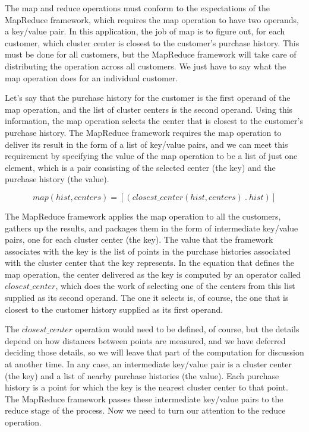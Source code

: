 The map and reduce operations must conform to the expectations of the MapReduce framework, which requires the map operation to have two operands,
a key/value pair.  In this application, the job of map is
to figure out, for each customer, which cluster center is closest to the customer's
purchase history. This must be done for all customers, but the MapReduce
framework will take care of distributing the operation across all customers.
We just have to say what the map operation does for an individual customer.

Let's say that the purchase history for the customer is the first operand
of the map operation, and the list of cluster centers is the second operand.
Using this information, the map operation selects the center that is closest
to the customer's purchase history. The MapReduce framework requires the map
operation to deliver its result in the form of a list of key/value pairs,
and we can meet this requirement by specifying the value of the map operation
to be a list of just one element, which is a pair consisting of
the selected center (the key) and the purchase history (the value).

\begin{displaymath}
map(hist, centers) = [ ( closest\_center(hist, centers) ~.~ hist ) ]
\end{displaymath}


The MapReduce framework applies the map operation to all the customers,
gathers up the results, and packages them in the form of
intermediate key/value pairs, one for each cluster center (the key).
The value that the framework associates with the key is the list of
points in the purchase histories associated with the cluster center that
the key represents. 
In the equation that defines the map operation,
the center delivered as the key is computed by an operator
called $closest\_center$, which does the work of selecting one
of the centers from this list supplied as its second operand.
The one it selects is, of course, the one that is closest to
the customer history supplied as its first operand.

The $closest\_center$ operation would need to be defined,
of course, but the details depend on how distances between
points are measured, and we have deferred deciding those 
details, so we will leave that part of the computation
for discussion at another time.
In any case, an intermediate key/value pair is a cluster center
(the key) and a list of nearby purchase histories
(the value). Each purchase history is a point for which the 
key is the nearest cluster center to that point. 
The MapReduce framework passes these intermediate key/value pairs 
to the reduce stage of the process.
Now we need to turn our attention to the reduce operation.

